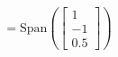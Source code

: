 \documentclass[preview]{standalone}
\begin{document}
\begin{align*}
= \text{Span}\left(\begin{bmatrix} 1 \\ -1 \\ 0.5 \end{bmatrix}\right)
\end{align*}
\end{document}
